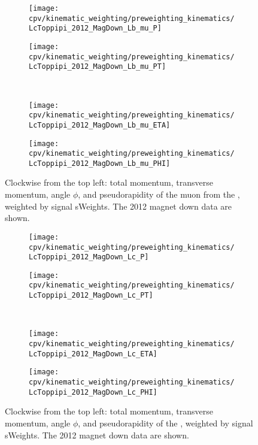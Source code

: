 \begin{figure}
  \begin{subfigure}[b]{0.4\textwidth}
    \texttt{[image: cpv/kinematic\_weighting/preweighting\_kinematics/LcToppipi\_2012\_MagDown\_Lb\_mu\_P]}
    \label{fig:cpv:kinematic_weighting:pre:Lb_mu:P}
  \end{subfigure}
  \begin{subfigure}[b]{0.4\textwidth}
    \texttt{[image: cpv/kinematic\_weighting/preweighting\_kinematics/LcToppipi\_2012\_MagDown\_Lb\_mu\_PT]}
    \label{fig:cpv:kinematic_weighting:pre:Lb_mu:PT}
  \end{subfigure}\\
  \begin{subfigure}[b]{0.4\textwidth}
    \texttt{[image: cpv/kinematic\_weighting/preweighting\_kinematics/LcToppipi\_2012\_MagDown\_Lb\_mu\_ETA]}
    \label{fig:cpv:kinematic_weighting:pre:Lb_mu:ETA}
  \end{subfigure}
  \begin{subfigure}[b]{0.4\textwidth}
    \texttt{[image: cpv/kinematic\_weighting/preweighting\_kinematics/LcToppipi\_2012\_MagDown\_Lb\_mu\_PHI]}
    \label{fig:cpv:kinematic_weighting:pre:Lb_mu:PHI}
  \end{subfigure}
  \caption{%
    Clockwise from the top left: total momentum, transverse momentum, angle 
    $\phi$, and pseudorapidity of the muon from the \PLambdab, weighted by 
    signal sWeights.
    The 2012 magnet down data are shown.
  }
  \label{fig:cpv:kinematic_weighting:pre:Lb_mu}
\end{figure}

\begin{figure}
  \begin{subfigure}[b]{0.4\textwidth}
    \texttt{[image: cpv/kinematic\_weighting/preweighting\_kinematics/LcToppipi\_2012\_MagDown\_Lc\_P]}
    \label{fig:cpv:kinematic_weighting:pre:Lc:P}
  \end{subfigure}
  \begin{subfigure}[b]{0.4\textwidth}
    \texttt{[image: cpv/kinematic\_weighting/preweighting\_kinematics/LcToppipi\_2012\_MagDown\_Lc\_PT]}
    \label{fig:cpv:kinematic_weighting:pre:Lc:PT}
  \end{subfigure}\\
  \begin{subfigure}[b]{0.4\textwidth}
    \texttt{[image: cpv/kinematic\_weighting/preweighting\_kinematics/LcToppipi\_2012\_MagDown\_Lc\_ETA]}
    \label{fig:cpv:kinematic_weighting:pre:Lc:ETA}
  \end{subfigure}
  \begin{subfigure}[b]{0.4\textwidth}
    \texttt{[image: cpv/kinematic\_weighting/preweighting\_kinematics/LcToppipi\_2012\_MagDown\_Lc\_PHI]}
    \label{fig:cpv:kinematic_weighting:pre:Lc:PHI}
  \end{subfigure}
  \caption{%
    Clockwise from the top left: total momentum, transverse momentum, angle 
    $\phi$, and pseudorapidity of the \PLambdac, weighted by signal sWeights.
    The 2012 magnet down data are shown.
  }
  \label{fig:cpv:kinematic_weighting:pre:Lc}
\end{figure}

